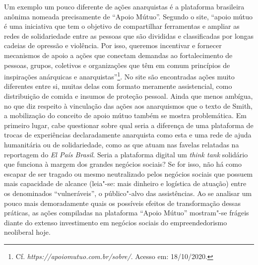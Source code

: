 Um exemplo um pouco diferente de ações anarquistas é a plataforma
brasileira anônima nomeada precisamente de ``Apoio Mútuo''. Segundo o
site, ``apoio mútuo é uma iniciativa que tem o objetivo de compartilhar
ferramentas e ampliar as redes de solidariedade entre as pessoas que são
divididas e classificadas por longas cadeias de opressão e violência.
Por isso, queremos incentivar e fornecer mecanismos de apoio a ações que
conectam demandas ao fortalecimento de pessoas, grupos, coletivos e
organizações que têm em comum princípios de inspirações anárquicas e
anarquistas''\footnote{Cf. \emph{https://apoiomutuo.com.br/sobre/}.
  Acesso em: 18/10/2020.}. No site são encontradas ações muito
diferentes entre si, muitas delas com formato meramente assistencial,
como distribuição de comida e insumos de proteção pessoal. Ainda que
menos ambígua, no que diz respeito à vinculação das ações aos
anarquismos que o texto de Smith, a mobilização do conceito de apoio
mútuo também se mostra problemática. Em primeiro lugar, cabe questionar
sobre qual seria a diferença de uma plataforma de trocas de experiências
declaradamente anarquista como esta e uma rede de ajuda humanitária ou
de solidariedade, como as que atuam nas favelas relatadas na reportagem
do \emph{El País Brasil}. Seria a plataforma digital um \emph{think
tank} solidário que funciona à margem dos grandes negócios sociais? Se
for isso, não há como escapar de ser tragado ou mesmo neutralizado pelos
negócios sociais que possuem mais capacidade de alcance (leia"-se: mais
dinheiro e logística de atuação) entre os denominados ``vulneráveis'', o
público"-alvo das assistências. Ao se analisar um pouco mais
demoradamente quais os possíveis efeitos de transformação dessas
práticas, as ações compiladas na plataforma ``Apoio Mútuo'' mostram"-se
frágeis diante do extenso investimento em negócios sociais do
empreendedorismo neoliberal hoje.

